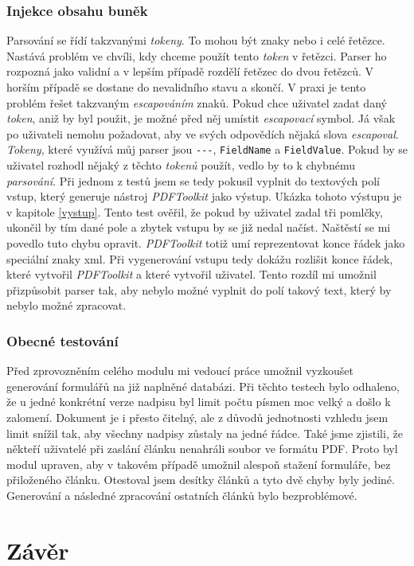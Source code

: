 \documentclass[czech,BP]{thesiskiv}
\begin{document}
\subsection{Injekce obsahu buněk}
Parsování se řídí takzvanými \emph{tokeny}. To mohou být znaky nebo i celé řetězce. Nastává problém ve chvíli, kdy chceme použít tento \emph{token} v řetězci. Parser ho rozpozná jako validní a v lepším případě rozdělí řetězec do dvou řetězců. V horším případě se dostane do nevalidního stavu a skončí. V praxi je tento problém řešet takzvaným \emph{escapováním} znaků. Pokud chce uživatel zadat daný \emph{token}, aniž by byl použit, je možné před něj umístit \emph{escapovací} symbol\cite{Parsovani}.
Já však po uživateli nemohu požadovat, aby ve svých odpovědích nějaká slova \emph{escapoval}. \emph{Tokeny}, které využívá můj parser jsou \texttt{-}\texttt{-}\texttt{-}, \texttt{FieldName} a \texttt{FieldValue}. Pokud by se uživatel rozhodl nějaký z těchto \emph{tokenů} použít, vedlo by to k chybnému \emph{parsování}. Při jednom z testů jsem se tedy pokusil vyplnit do textových polí vstup, který generuje nástroj \emph{PDFToolkit} jako výstup. Ukázka tohoto výstupu je v kapitole \ref{vystup}. Tento test ověřil, že pokud by uživatel zadal tři pomlčky, ukončil by tím dané pole a zbytek vstupu by se již nedal načíst. Naštěstí se mi povedlo tuto chybu opravit. \emph{PDFToolkit} totiž umí reprezentovat konce řádek jako speciální znaky xml. Při vygenerování vstupu tedy dokážu rozlišit konce řádek, které vytvořil \emph{PDFToolkit} a které vytvořil uživatel. Tento rozdíl mi umožnil přizpůsobit parser tak, aby nebylo možné vyplnit do polí takový text, který by nebylo možné zpracovat.
\subsection{Obecné testování}
Před zprovozněním celého modulu mi vedoucí práce umožnil vyzkoušet generování formulářů na již naplněné databázi. Při těchto testech bylo odhaleno, že u jedné konkrétní verze nadpisu byl limit počtu písmen moc velký a došlo k zalomení. Dokument je i přesto čitelný, ale z důvodů jednotnosti vzhledu jsem limit snížil tak, aby všechny nadpisy zůstaly na jedné řádce. Také jsme zjistili, že někteří uživatelé při zaslání článku nenahráli soubor ve formátu PDF. Proto byl modul upraven, aby v takovém případě umožnil alespoň stažení formuláře, bez přiloženého článku. Otestoval jsem desítky článků a tyto dvě chyby byly jediné. Generování a následné zpracování ostatních článků bylo bezproblémové.
\chapter{Závěr}

%

{\raggedright\small

}
\end{document}
